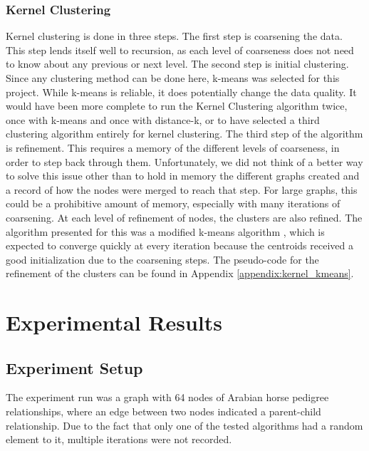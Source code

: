 \documentclass[12pt]{article}
\begin{document}
\subsubsection{Kernel Clustering}
Kernel clustering is done in three steps. The first step is coarsening the data. This step lends itself well to recursion, as each level of coarseness does not need to know about any previous or next level. \newline\newline
The second step is initial clustering. Since any clustering method can be done here, k-means was selected for this project. While k-means is reliable, it does potentially change the data quality. It would have been more complete to run the Kernel Clustering algorithm twice, once with k-means and once with distance-k, or to have selected a third clustering algorithm entirely for kernel clustering.
\newline\newline
The third step of the algorithm is refinement. This requires a memory of the different levels of coarseness, in order to step back through them. Unfortunately, we did not think of a better way to solve this issue other than to hold in memory the different graphs created and a record of how the nodes were merged to reach that step. For large graphs, this could be a prohibitive amount of memory, especially with many iterations of coarsening.
\newline\newline
At each level of refinement of nodes, the clusters are also refined. The algorithm presented for this was a modified k-means algorithm \cite{kmeans}, which is expected to converge quickly at every iteration because the centroids received a good initialization due to the coarsening steps. The pseudo-code for the refinement of the clusters can be found in Appendix \ref{appendix:kernel_kmeans}.

\newpage
\section{Experimental Results}

\subsection{Experiment Setup}
The experiment run was a graph with 64 nodes of Arabian horse pedigree relationships, where an edge between two nodes indicated a parent-child relationship. Due to the fact that only one of the tested algorithms had a random element to it, multiple iterations were not recorded.
\end{document}

